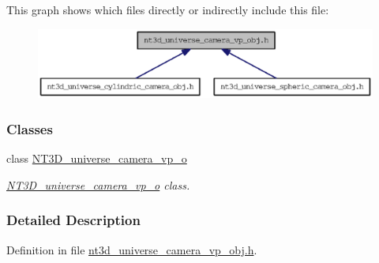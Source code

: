 This graph shows which files directly or indirectly include this file:
\nopagebreak
\begin{figure}[H]
\begin{center}
\leavevmode
\includegraphics[width=400pt]{nt3d__universe__camera__vp__obj_8h__dep__incl}
\end{center}
\end{figure}
\subsubsection*{Classes}
\begin{DoxyCompactItemize}
\item 
class \hyperlink{class_n_t3_d__universe__camera__vp__o}{NT3D\_\-universe\_\-camera\_\-vp\_\-o}
\begin{DoxyCompactList}\small\item\em \hyperlink{class_n_t3_d__universe__camera__vp__o}{NT3D\_\-universe\_\-camera\_\-vp\_\-o} class. \item\end{DoxyCompactList}\end{DoxyCompactItemize}


\subsubsection{Detailed Description}


Definition in file \hyperlink{nt3d__universe__camera__vp__obj_8h_source}{nt3d\_\-universe\_\-camera\_\-vp\_\-obj.h}.

